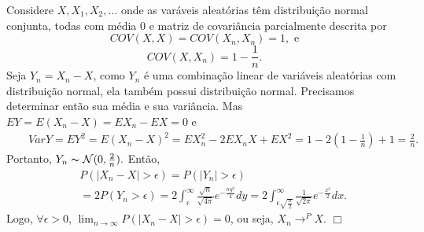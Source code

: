 \begin{frame}
%
%
\begin{exem}
Considere $X,X_1,X_2,\ldots$ onde as varáveis aleatórias têm
distribuição normal conjunta, todas com média 0 e matriz de
covariância parcialmente descrita por
$$COV(X,X)=COV(X_n,X_n)=1, \mbox{ e}$$
$$COV(X,X_n)=1-\frac{1}{n}.$$
Seja $Y_n=X_n-X$, como $Y_n$ é uma combinação linear de variáveis
aleatórias com distribuição normal, ela também possui distribuição
normal. Precisamos determinar então sua média e sua variância. Mas
$EY=E(X_n-X)=EX_n-EX=0$ e
%
%
%
%
\begin{eqnarray}
& & VarY=EY^2=E(X_n-X)^2=EX_n^2-2EX_nX+EX^2=1-2(1-\frac{1}{n})+1=\frac{2}{n}.\nonumber
\end{eqnarray}
Portanto, $Y_n\thicksim {\cal N}(0,\frac{2}{n}).$ Então,
\begin{eqnarray}
& & P(|X_n-X|>
\epsilon)=P(|Y_n|>\epsilon)\nonumber \\
& & =2P(Y_n>\epsilon)=2\int_{\epsilon}^{\infty}\frac{\sqrt{n}}{\sqrt{4\pi}}e^{-\frac{ny^2}{4}}dy=2\int_{\epsilon
\sqrt{\frac{n}{2}}}^{\infty}\frac{1}{\sqrt{2\pi}}e^{-\frac{x^2}{2}}dx.\nonumber
\end{eqnarray}
Logo, $\forall \epsilon> 0$, $\lim_{n\rightarrow\infty}P(|X_n-X|>
\epsilon)=0$, ou seja, $X_n\rightarrow^P X$. $\Box$
\end{exem}

\end{frame}
%
